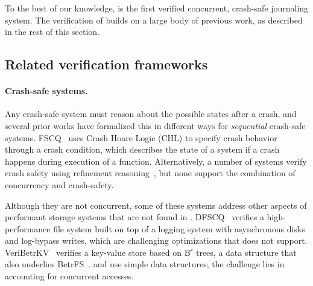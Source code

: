 To the best of our knowledge, \txn is the first verified concurrent,
crash-safe journaling system. The verification of \txn builds on a
large body of previous work, as described in the rest of this
section.

\subsection{Related verification frameworks}

\paragraph{Crash-safe systems.}

Any crash-safe system
must reason about the possible states after a crash, and several prior works
have formalized this in different ways for \emph{sequential} crash-safe systems.
FSCQ~\cite{chen:fscq,chen:dfscq} uses Crash Hoare Logic (CHL) to specify crash
behavior through a crash condition, which describes the state of a system if a
crash happens during execution of a function. Alternatively, a number of systems
verify crash safety using refinement
reasoning~\cite{sigurbjarnarson:yggdrasil,ernst:crash-refinement-asms,chajed:argosy,hance:veribetrkv},
but none support the combination of concurrency and crash-safety.



Although they are not concurrent, some of these systems address other
aspects of performant storage systems that are not found in \txn.
DFSCQ~\cite{chen:dfscq} verifies a high-performance file system built
on top of a logging system with asynchronous disks and log-bypass
writes, which are challenging optimizations that \txn does not
support. VeriBetrKV~\cite{hance:veribetrkv} verifies a key-value store
based on B\textsuperscript{$\epsilon$} trees, a data structure that also underlies BetrFS~\cite{jannen:betrfs}. \txn
and \simplenfs use simple data structures;
the challenge lies in accounting for concurrent accesses.

